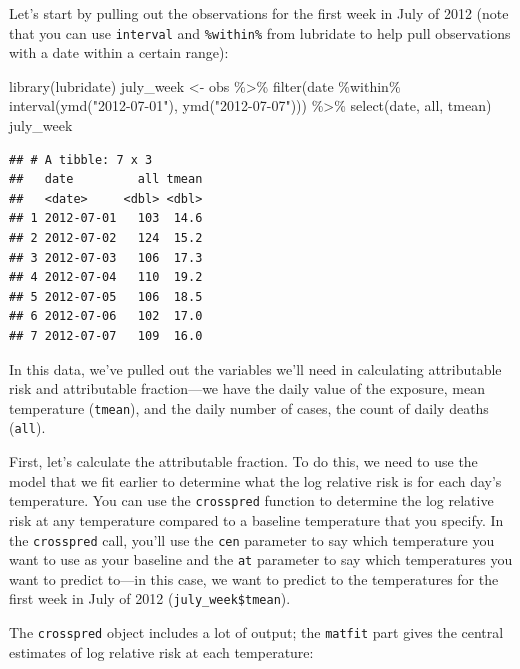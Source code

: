\documentclass[
]{book}
\newenvironment{Shaded}{\begin{snugshade}}{\end{snugshade}}
\newcommand{\FunctionTok}[1]{\textcolor[rgb]{0.00,0.00,0.00}{#1}}
\newcommand{\NormalTok}[1]{#1}
\newcommand{\OtherTok}[1]{\textcolor[rgb]{0.56,0.35,0.01}{#1}}
\newcommand{\SpecialCharTok}[1]{\textcolor[rgb]{0.00,0.00,0.00}{#1}}
\newcommand{\StringTok}[1]{\textcolor[rgb]{0.31,0.60,0.02}{#1}}
\begin{document}
Let's start by pulling out the observations for the first week in July of 2012 (note that you can use \texttt{interval} and \texttt{\%within\%} from lubridate to help pull observations with a date within a certain range):

\begin{Shaded}
\begin{Highlighting}[]
\FunctionTok{library}\NormalTok{(lubridate)}
\NormalTok{july\_week }\OtherTok{\textless{}{-}}\NormalTok{ obs }\SpecialCharTok{\%\textgreater{}\%} 
  \FunctionTok{filter}\NormalTok{(date }\SpecialCharTok{\%within\%} \FunctionTok{interval}\NormalTok{(}\FunctionTok{ymd}\NormalTok{(}\StringTok{"2012{-}07{-}01"}\NormalTok{), }\FunctionTok{ymd}\NormalTok{(}\StringTok{"2012{-}07{-}07"}\NormalTok{))) }\SpecialCharTok{\%\textgreater{}\%} 
  \FunctionTok{select}\NormalTok{(date, all, tmean)}
\NormalTok{july\_week}
\end{Highlighting}
\end{Shaded}

\begin{verbatim}
## # A tibble: 7 x 3
##   date         all tmean
##   <date>     <dbl> <dbl>
## 1 2012-07-01   103  14.6
## 2 2012-07-02   124  15.2
## 3 2012-07-03   106  17.3
## 4 2012-07-04   110  19.2
## 5 2012-07-05   106  18.5
## 6 2012-07-06   102  17.0
## 7 2012-07-07   109  16.0
\end{verbatim}

In this data, we've pulled out the variables we'll need in calculating attributable risk and attributable fraction---we have the daily value of the exposure, mean temperature (\texttt{tmean}), and the daily number of cases, the count of daily deaths (\texttt{all}).

First, let's calculate the attributable fraction. To do this, we need to use
the model that we fit earlier to determine what the log relative risk is for each day's temperature. You can use the \texttt{crosspred} function to determine the log relative risk at any temperature compared to a baseline temperature that you specify. In the \texttt{crosspred} call, you'll use the \texttt{cen} parameter to say which temperature you want to use as your baseline and the \texttt{at} parameter to say which temperatures you want to predict to---in this case, we want to predict to the temperatures for the first week in July of 2012 (\texttt{july\_week\$tmean}).

The \texttt{crosspred} object includes a lot of output; the \texttt{matfit} part gives the central estimates of log relative risk at each temperature:
\end{document}
